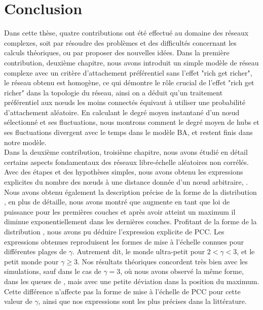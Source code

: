 %
\chapter*{Conclusion}
 


Dans cette thèse, quatre contributions ont été effectué au domaine des réseaux complexes, soit par résoudre des problèmes et des difficultés concernant les calculs théoriques, ou par proposer des nouvelles idées. Dans la première contribution, deuxième chapitre, nous avons introduit un simple modèle de réseau complexe avec un critère d'attachement préférentiel sans l'effet "rich get richer", le réseau obtenu est homogène, ce qui démontre le rôle crucial de l'effet "rich get richer" dans la topologie du réseau, ainsi on a déduit qu'un traitement préférentiel aux nœuds les moins connectés équivaut à utiliser une probabilité d'attachement aléatoire. En calculant le degré moyen instantané d'un nœud sélectionné et ses fluctuations, nous montrons comment le degré moyen de hubs et ses fluctuations divergent avec le temps dans le modèle BA, et restent finis dans notre modèle.\\

Dans la deuxième contribution, troisième chapitre, nous avons étudié en détail certains aspects fondamentaux des réseaux libre-échelle aléatoires non corrélés. Avec des étapes et des hypothèses simples, nous avons obtenu les expressions explicites du nombre des nœuds à une distance donnée d'un nœud arbitraire, \nl\nolinebreak. Nous avons obtenu également la description précise de la forme de la distribution \nolinebreak, en plus de détaille, nous avons montré que \nl augmente en tant que loi de puissance pour les premières couches et après avoir atteint un maximum il diminue exponentiellement dans les dernières couches. Profitant de la forme de la distribution \nl, nous avons pu déduire l'expression explicite de PCC. Les expressions obtenues reproduisent les formes de mise à l'échelle connues pour différentes plages de $\gamma$. Autrement dit, le monde ultra-petit pour $2<\gamma<3$, et le petit monde pour $\gamma\ge 3$. Nos résultats théoriques concordent très bien avec les simulations, sauf dans le cas de $\gamma=3$, où nous avons observé la même forme, dans les queues de \nl, mais avec une petite déviation dans la position du maximum. Cette différence n'affecte pas la forme de mise à l'échelle de PCC pour cette valeur de $\gamma$, ainsi que nos expressions sont les plus précises dans la littérature.\\

